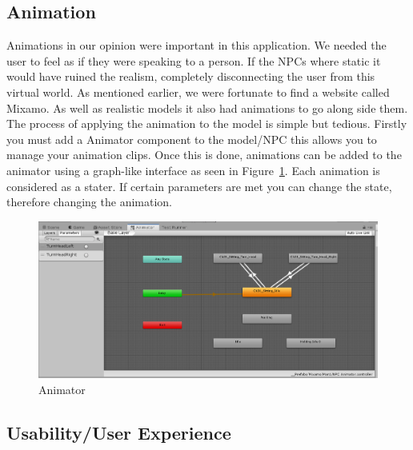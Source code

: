 \subsection{Animation}
Animations in our opinion were important in this application. We needed the user to feel as if they were speaking to a person. If the NPCs where static it would have ruined the realism, completely disconnecting the user from this virtual world. As mentioned earlier, we were fortunate to find a website called Mixamo. As well as realistic models it also had animations to go along side them. The process of applying the animation to the model is simple but tedious. Firstly you must add a Animator component to the model/NPC this allows you to manage your animation clips. Once this is done, animations can be added to the animator using a graph-like interface as seen in Figure~\ref{fig:anim}. Each animation is considered as a stater. If certain parameters are met you can change the state, therefore changing the animation.

\begin{figure}[!ht]
    \centering
    \includegraphics[width=1\textwidth]{Images/animator.PNG}
    \caption{Animator}
    \label{fig:anim}
\end{figure}

\subsection{Usability/User Experience}

